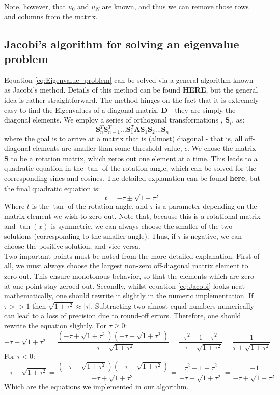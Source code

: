 \documentclass[a4paper, 10pt]{article}
\begin{document}
Note, however, that $u_0$ and $u_N$ are known, and thus we can remove those rows and columns from the matrix.
\subsection{Jacobi's algorithm for solving an eigenvalue problem}
Equation \ref{eq:Eigenvalue_problem} can be solved via a general algorithm known as Jacobi's method. Details of this method can be found \textbf{HERE}, but the general idea is rather straightforward. The method hinges on the fact that it is extremely easy to find the Eigenvalues of a diagonal matrix, $\mathbf{D}$ - they are simply the diagonal elements. We employ a series of orthogonal transformations , $\mathbf{S}_i$, as:
$$\mathbf{S}_n^T\mathbf{S}_{n-1}^T...\mathbf{S}_1^T\mathbf{A}\mathbf{S}_1\mathbf{S}_2...\mathbf{S}_n$$
where the goal is to arrive at a matrix that is (almost) diagonal - that is, all off-diagonal elements are smaller than some threshold value, $\epsilon$. We chose the matrix $\mathbf{S}$ to be a rotation matrix, which zeros out one element at a time. This leads to a quadratic equation in the $\tan$ of the rotation angle, which can be solved for the corresponding sines and cosines. The detailed explanation can be found \textbf{here}, but the final quadratic equation is:
\begin{equation}\label{eq:Jacobi}
t=-\tau \pm \sqrt{1+\tau^2}
\end{equation} 
Where $t$ is the $\tan$ of the rotation angle, and $\tau$ is a parameter depending on the matrix element we wish to zero out. Note that, because this is a rotational matrix and $\tan(x)$ is symmetric, we can always choose the smaller of the two solutions (corresponding to the smaller angle). Thus, if $\tau$ is negative, we can choose the positive solution, and vice versa.\\
\linebreak
Two important points must be noted from the more detailed explanation.
First of all, we must always choose the largest non-zero off-diagonal matrix element to zero out. This ensure monotonous behavior, so that the elements which are zero at one point stay zeroed out. Secondly, whilst equation \ref{eq:Jacobi} looks neat mathematically, one should rewrite it slightly in the numeric implementation. If  $\tau >> 1$ then $\sqrt{1+\tau^2}\approx |\tau|$. Subtracting two almost equal numbers numerically can lead to a loss of precision due to round-off errors. Therefore, one should rewrite the equation slightly. For $\tau \geq 0$:
\begin{equation}
-\tau + \sqrt{1+\tau^2}=\frac{(-\tau + \sqrt{1+\tau^2})(-\tau-\sqrt{1+\tau^2})}{-\tau-\sqrt{1+\tau^2}}=\frac{\tau^2-1-\tau^2}{-\tau-\sqrt{1+\tau^2}}=\frac{1}{\tau+\sqrt{1+\tau^2}}
\end{equation}
For $\tau < 0$:
\begin{equation}
-\tau - \sqrt{1+\tau^2}=\frac{(-\tau - \sqrt{1+\tau^2})(-\tau+\sqrt{1+\tau^2})}{-\tau+\sqrt{1+\tau^2}}=\frac{\tau^2-1-\tau^2}{-\tau+\sqrt{1+\tau^2}}=\frac{-1}{-\tau+\sqrt{1+\tau^2}}
\end{equation}
Which are the equations we implemented in our algorithm.
\end{document}
